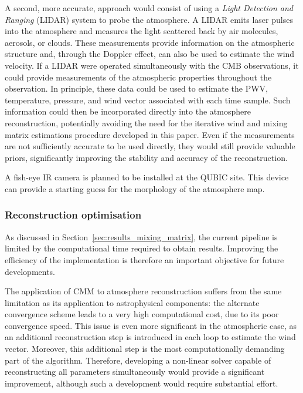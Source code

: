 \documentclass[a4paper,11pt]{article}
\begin{document}
A second, more accurate, approach would consist of using a \emph{Light Detection and Ranging} (LIDAR) system to probe the atmosphere. A LIDAR emits laser pulses into the atmosphere and measures the light scattered back by air molecules, aerosols, or clouds. These measurements provide information on the atmospheric structure and, through the Doppler effect, can also be used to estimate the wind velocity.
If a LIDAR were operated simultaneously with the CMB observations, it could provide measurements of the atmospheric properties throughout the observation. In principle, these data could be used to estimate the PWV, temperature, pressure, and wind vector associated with each time sample. Such information could then be incorporated directly into the atmosphere reconstruction, potentially avoiding the need for the iterative wind and mixing matrix estimations procedure developed in this paper. Even if the measurements are not sufficiently accurate to be used directly, they would still provide valuable priors, significantly improving the stability and accuracy of the reconstruction.

A fish-eye IR camera is planned to be installed at the QUBIC site. This device can provide a starting guess for the morphology of the atmosphere map.

\subsubsection{Reconstruction optimisation}

As discussed in Section~\ref{sec:results_mixing_matrix}, the current pipeline is limited by the computational time required to obtain results. Improving the efficiency of the implementation is therefore an important objective for future developments.

The application of CMM to atmosphere reconstruction suffers from the same limitation as its application to astrophysical components: the alternate convergence scheme leads to a very high computational cost, due to its poor convergence speed. This issue is even more significant in the atmospheric case, as an additional reconstruction step is introduced in each loop to estimate the wind vector. Moreover, this additional step is the most computationally demanding part of the algorithm. Therefore, developing a non-linear solver capable of reconstructing all parameters simultaneously would provide a significant improvement, although such a development would require substantial effort.
\end{document}
